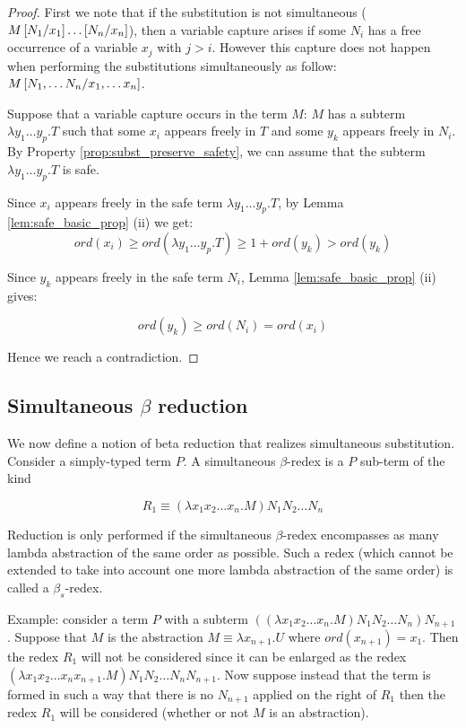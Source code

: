 \begin{proof}
First we note that if the substitution is not simultaneous ($M
\left[ N_1/x_1 \right]\ldots \left[ N_n/x_n \right]$), then a variable capture
arises if some $N_i$ has a free occurrence of a variable $x_j$ with
$j>i$. However this capture does not happen when performing the
substitutions simultaneously as follow: $M \left[ N_1, \ldots
N_n/x_1, \ldots x_n \right]$.



Suppose that a variable capture occurs in the term $M$: $M$ has a
subterm $\lambda y_1 \ldots y_p. T$ such that some $x_i$ appears
freely in $T$ and some $y_k$ appears freely in $N_i$. By Property
\ref{prop:subst_preserve_safety}, we can assume that the subterm
$\lambda y_1 \ldots y_p . T$ is safe.

Since $x_i$ appears freely in the safe term $\lambda y_1 \ldots y_p
. T$, by Lemma \ref{lem:safe_basic_prop} (ii) we get:
$$ ord(x_i) \geq ord(\lambda y_1 \ldots y_p . T) \geq 1+ ord(y_k) > ord(y_k)$$

Since $y_k$ appears freely in the safe term $N_i$, Lemma
\ref{lem:safe_basic_prop} (ii) gives:

$$ ord(y_k) \geq ord(N_i) = ord(x_i)$$

Hence we reach a contradiction.
\end{proof}


\subsection{Simultaneous $\beta$ reduction}

We now define a notion of beta reduction that realizes simultaneous
substitution. Consider a simply-typed term $P$. A simultaneous
$\beta$-redex is a $P$ sub-term of the kind

$$R_1 \equiv (\lambda x_1 x_2 \ldots x_n . M) N_1 N_2 \ldots N_n$$

Reduction is only performed if the simultaneous $\beta$-redex
encompasses as many lambda abstraction of the same order as
possible. Such a redex (which cannot be extended to take into
account one more lambda abstraction of the same order) is called a
$\beta_s$-redex.


Example: consider a term $P$ with a subterm $((\lambda x_1 x_2
\ldots x_n . M) N_1 N_2 \ldots N_n) N_{n+1}$. Suppose that $M$ is
the abstraction $M \equiv \lambda x_{n+1} . U$ where $ord(x_{n+1}) =
x_1$. Then the redex $R_1$ will not be considered since it can be
enlarged as the redex $(\lambda x_1 x_2 \ldots x_n x_{n+1}. M) N_1
N_2 \ldots N_n N_{n+1}$. Now suppose instead that the term is formed
in such a way that there is no $N_{n+1}$ applied on the right of
$R_1$ then the redex $R_1$ will be considered (whether or not $M$ is
an abstraction).

